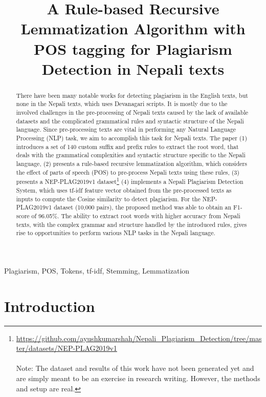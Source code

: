 \documentclass[conference]{IEEEtran}
\title{A Rule-based Recursive Lemmatization Algorithm with POS tagging for
  Plagiarism Detection in Nepali texts
}
\author{\IEEEauthorblockN{Ayush Kumar Shah}
  \IEEEauthorblockA{\textit{Department of Computing and Information Sciences} \\
  \textit{Rochester Institute of Technology} \\
Rochester, NY 14623, USA \\
as1211@rit.edu
}}
\begin{document}
\maketitle

\begin{abstract}
There have been many notable works for detecting plagiarism in the English
texts, but none in the Nepali texts, which uses Devanagari scripts. It is mostly
due to the
involved challenges in the pre-processing of Nepali texts caused by the lack of
available datasets and the complicated
grammatical rules and syntactic structure of the Nepali language. Since
pre-processing texts are vital in performing any Natural Language Processing
(NLP) task, we aim to accomplish this task for Nepali texts. The paper
(1) introduces a set of 140 custom suffix and prefix rules to extract the root word, 
that deals with the grammatical complexities and syntactic structure specific to 
the Nepali language, (2) presents a rule-based recursive lemmatization
algorithm, which considers the effect of parts of speech (POS)
to pre-process Nepali texts using these rules, (3) presents a
NEP-PLAG2019v1
dataset\footnote{\url{https://github.com/ayushkumarshah/Nepali_Plagiarism_Detection/tree/master/datasets/NEP-PLAG2019v1}
\\\\Note: The dataset and results of this work have not been generated yet 
and are simply meant to be an exercise in research writing. However, the 
methods and setup are real.}
(4) implements a Nepali Plagiarism Detection System, which uses tf-idf feature vector 
obtained from the pre-processed texts as inputs to compute the Cosine similarity 
to detect plagiarism.
For the NEP-PLAG2019v1 dataset (10,000 pairs), the proposed method was able
to obtain an F1-score of 96.05\%. 
The ability to extract root words with higher accuracy from Nepali texts, 
with the complex grammar and structure handled by the introduced rules, gives
rise to opportunities to perform various NLP tasks in the Nepali language.
\end{abstract}

\begin{IEEEkeywords}
Plagiarism, POS, Tokens, tf-idf, Stemming, Lemmatization
\end{IEEEkeywords}

\section{Introduction}
\end{document}
